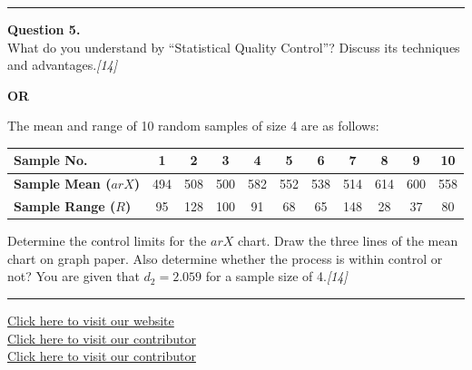 \documentclass[11pt,a4paper]{article}
\newcommand{\pts}[1]{\hfill   \textit{[#1]}}
\begin{document}
\medskip\rule{\linewidth}{0.2pt}




\noindent   \textbf{Question 5.} \\
What do you understand by ``Statistical Quality Control''? Discuss its techniques and advantages.\pts{14}

\centerline{   \textbf{OR}}

The mean and range of 10 random samples of size 4 are as follows:

\begin{center}
\renewcommand{\arraystretch}{1.2}
\small

\begin{tabular}{|l|c|c|c|c|c|c|c|c|c|c|}
\hline
   \textbf{Sample No.}           &   \textbf{1} &   \textbf{2} &   \textbf{3} &   \textbf{4} &   \textbf{5} &   \textbf{6} &   \textbf{7} &   \textbf{8} &   \textbf{9} &   \textbf{10} \\ \hline
   \textbf{Sample Mean ($ar{X}$)} & 494        & 508        & 500        & 582        & 552        & 538        & 514        & 614        & 600        & 558         \\ \hline
   \textbf{Sample Range ($R$)}    & 95         & 128        & 100        & 91         & 68         & 65         & 148        & 28         & 37         & 80          \\ \hline
\end{tabular}
\end{center}
Determine the control limits for the $ar{X}$ chart. Draw the three lines of the mean chart on graph paper. Also determine whether the process is within control or not? You are given that $d_2 = 2.059$ for a sample size of 4.\pts{14}

\vfill
\rule{\linewidth}{0.4pt}

\begin{center}\small
  \href{https://bhu-exam.vercel.app/}{Click here to visit our website}\\[4pt]
  \href{https://me-aryan.vercel.app/}{Click here to visit our contributor}\\[4pt]
  \href{https://quashan-me.vercel.app/}{Click here to visit our contributor}
\end{center}
\end{document}
